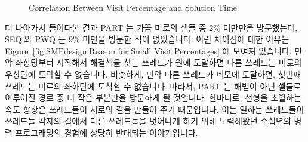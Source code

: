 \begin{figure}[tb]
\centering
{}
\caption{Correlation Between Visit Percentage and Solution Time}
\label{fig:SMPdesign:Correlation Between Visit Percentage and Solution Time}
\end{figure}

더 나아가서 들여다본 결과 PART 는 가끔 미로의 셀들 중 2\% 미만만을 방문했는데,
SEQ 와 PWQ 는 9\% 미만을 방문한 적이 없었습니다.
이런 차이점에 대한 이유는
Figure~\ref{fig:SMPdesign:Reason for Small Visit Percentages} 에 보여져
있습니다.
만약 좌상당부터 시작해서 해결책을 찾는 쓰레드가 원에 도달하면 다른 쓰레드는
미로의 우상단에 도락할 수 없습니다.
비슷하게, 만약 다른 쓰레드가 네모에 도달하면, 첫번째 쓰레드는 미로의 좌하단에
도착할 수 없습니다.
따라서, PART 는 해법이 아닌 셀들로 이루어진 경로 중 더 작은 부분만을 방문하게
될 것입니다.
한마디로, 선형을 초월하는 속도 향상은 쓰레드들이 서로의 길을 만들어 주기
때문입니다.
이는 일하는 쓰레드들이 쓰레드들 각자의 길에서 다른 쓰레드들을 벗어나게 하기
위해 노력해왔던 수십년의 병렬 프로그래밍의 경험에 상당히 반대되는 이야기입니다.

